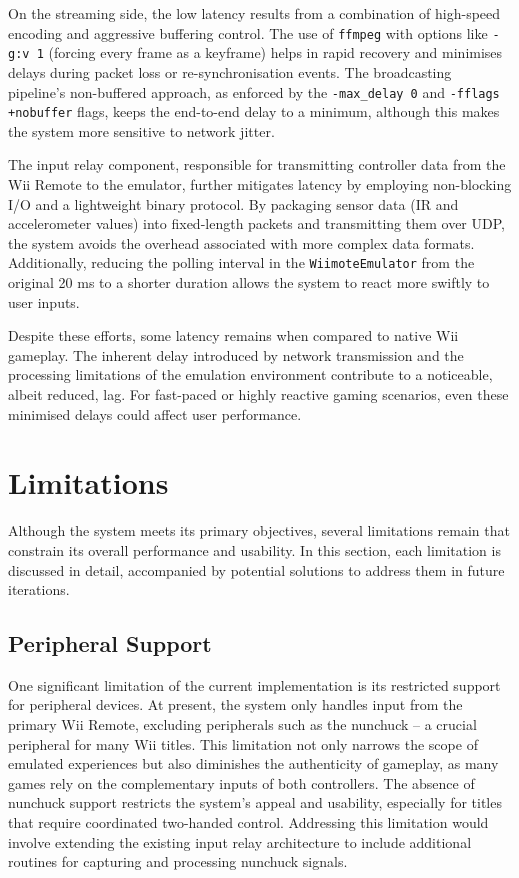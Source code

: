 On the streaming side, the low latency results from a combination of
high-speed encoding and aggressive buffering control. The use of \texttt{ffmpeg}
with options like \texttt{-g:v 1} (forcing every frame as a keyframe) helps in
rapid recovery and minimises delays during packet loss or re-synchronisation
events. The broadcasting pipeline’s non-buffered approach, as enforced by the
\texttt{-max\_delay 0} and \texttt{-fflags +nobuffer} flags, keeps the
end-to-end delay to a minimum, although this makes the system more
sensitive to network jitter.

The input relay component, responsible for transmitting controller data from the
Wii Remote to the emulator, further mitigates latency by employing non-blocking
I/O and a lightweight binary protocol. By packaging sensor data (IR and
accelerometer values) into fixed-length packets and transmitting them over UDP,
the system avoids the overhead associated with more complex data formats.
Additionally, reducing the polling interval in the \texttt{WiimoteEmulator} from
the original 20 ms to a shorter duration allows the system to react more swiftly
to user inputs.

Despite these efforts, some latency remains when compared to native Wii
gameplay. The inherent delay introduced by network transmission and the
processing limitations of the emulation environment contribute to a noticeable,
albeit reduced, lag. For fast-paced or highly reactive gaming scenarios, even
these minimised delays could affect user performance.

\section{Limitations}

Although the system meets its primary objectives, several limitations remain that constrain its overall performance and usability. In this section, each limitation is discussed in detail, accompanied by potential solutions to address them in future iterations.

\subsection{Peripheral Support}

One significant limitation of the current implementation is its restricted
support for peripheral devices. At present, the system only handles input from
the primary Wii Remote, excluding peripherals such as the nunchuck -- a crucial peripheral for many Wii
titles. This limitation not only narrows the scope of emulated experiences but
also diminishes the authenticity of gameplay, as many games rely on the
complementary inputs of both controllers. The absence of nunchuck support
restricts the system’s appeal and usability, especially for titles that require
coordinated two-handed control. Addressing this limitation would involve extending
the existing input relay architecture to include additional routines for
capturing and processing nunchuck signals.

